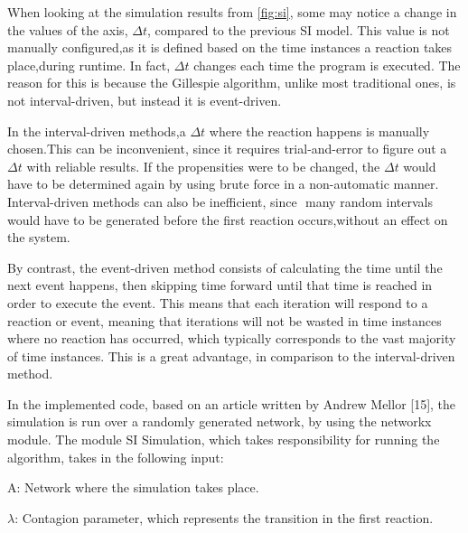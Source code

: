 \documentclass{article}
\begin{document}
When‌‌ looking‌‌ at ‌‌the ‌‌simulation ‌‌results‌‌ from \autoref{fig:si}, ‌‌some‌‌ may‌‌ notice‌‌ a‌‌ change‌‌ in‌‌ the‌‌ values‌‌ of‌‌ the‌‌ axis,‌ $\Delta t$,‌‌ compared‌‌ to‌‌ the‌‌ previous‌‌ SI‌‌ model.‌‌ This‌‌ value‌‌ is‌‌ not‌‌ manually‌‌ configured,‌‌as‌‌ it‌‌ is‌‌ defined‌‌ based‌‌ on‌‌ the‌‌ time‌‌ instances‌‌ a‌‌ reaction‌‌ takes‌‌ place,‌‌during‌‌ runtime. ‌‌In‌‌ fact, $\Delta t$ ‌changes‌‌ each‌ ‌time‌ ‌the‌ ‌program‌ ‌is‌ ‌executed.‌ ‌The‌ ‌reason‌ ‌for‌ ‌this‌ ‌is‌ ‌because‌ ‌the‌ ‌Gillespie‌ ‌algorithm,‌‌ unlike‌ ‌most‌ ‌traditional‌ ‌ones,‌ ‌is not ‌interval-driven,‌ ‌but‌ ‌instead‌ ‌it‌ ‌is‌ ‌event-driven.

‌‌In‌ ‌the ‌‌interval-driven ‌‌methods,‌‌a‌‌ $\Delta t$‌ where‌‌ the‌‌ reaction ‌‌happens‌‌ is ‌‌manually ‌‌chosen.‌‌This‌‌ can‌‌ be‌ ‌inconvenient,‌ ‌since‌ ‌it‌ ‌requires‌ ‌trial-and-error‌ ‌to‌ ‌figure‌ ‌out‌ ‌a‌ $\Delta t$ ‌with‌ ‌reliable‌ ‌results.‌ ‌If‌ ‌the‌‌ propensities‌ ‌were‌ ‌to‌ ‌be‌ ‌changed,‌ ‌the‌ ‌$\Delta t$ ‌would‌ ‌have‌ ‌to‌ ‌be‌ ‌determined‌ ‌again‌ ‌by‌ ‌using‌ ‌brute‌‌ force‌ ‌in‌ ‌a‌ ‌non-automatic‌ ‌manner.‌ ‌Interval-driven‌ ‌methods‌ ‌can‌ ‌also‌ ‌be‌ ‌inefficient, since‌ ‌ many‌‌ random‌‌ intervals ‌‌would ‌‌have‌‌ to‌‌ be‌‌ generated‌‌ before‌‌ the‌‌ first‌‌ reaction‌‌ occurs,‌‌without ‌‌an ‌‌effect‌‌ on‌ ‌the‌ ‌system.‌‌

By‌ ‌contrast,‌ ‌the‌ ‌event-driven‌ ‌method‌ ‌consists‌ ‌of‌ ‌calculating‌ ‌the‌ ‌time‌ ‌until‌ ‌the‌ ‌next‌ ‌event‌‌ happens,‌ ‌then‌ ‌skipping‌ ‌time‌ ‌forward‌ ‌until‌ ‌that‌ ‌time‌ ‌is‌ ‌reached‌ ‌in‌ ‌order‌ ‌to‌ ‌execute‌ ‌the‌ ‌event.‌‌ This‌ ‌means‌ ‌that‌ ‌each‌ ‌iteration‌ ‌will‌ ‌respond‌ ‌to‌ ‌a ‌‌reaction ‌‌or ‌‌event,‌ meaning ‌‌that‌‌ iterations‌‌ will‌‌ not ‌‌be‌‌ wasted ‌‌in‌‌ time‌‌ instances‌‌ where‌‌ no‌‌ reaction‌‌ has‌‌ occurred,‌ which‌‌ typically ‌‌corresponds ‌‌to‌‌ the‌ ‌vast‌ ‌majority‌ ‌of‌ ‌time‌ ‌instances.‌ ‌This‌ ‌is‌ ‌a‌ ‌great‌ ‌advantage,‌ ‌in‌ ‌comparison‌ ‌to‌ ‌the‌‌ interval-driven‌ ‌method.‌

In‌ ‌the‌ ‌implemented‌ ‌code,‌ ‌based‌ ‌on‌ ‌an‌ ‌article‌ ‌written‌ ‌by‌‌ Andrew‌‌ Mellor [15‌], the‌‌ simulation‌‌ is‌‌ run‌ ‌over‌ ‌a‌ ‌randomly‌ ‌generated‌ ‌network,‌ ‌by‌ ‌using‌ ‌the‌ ‌networkx‌ ‌module.‌ ‌The‌ ‌module‌‌ SI Simulation,‌ ‌which‌ ‌takes‌ ‌responsibility‌ ‌for‌ ‌running‌ ‌the‌ ‌algorithm,‌ ‌takes‌ ‌in‌ ‌the‌ ‌following‌ ‌input:‌ ‌

A:‌ ‌Network‌ ‌where‌ ‌the‌ ‌simulation‌ ‌takes‌ ‌place.

$\lambda$:‌ ‌Contagion‌ ‌parameter,‌ ‌which‌ ‌represents‌ ‌the‌ ‌transition‌ ‌in‌ ‌the‌ ‌first‌ ‌reaction.
\end{document}

